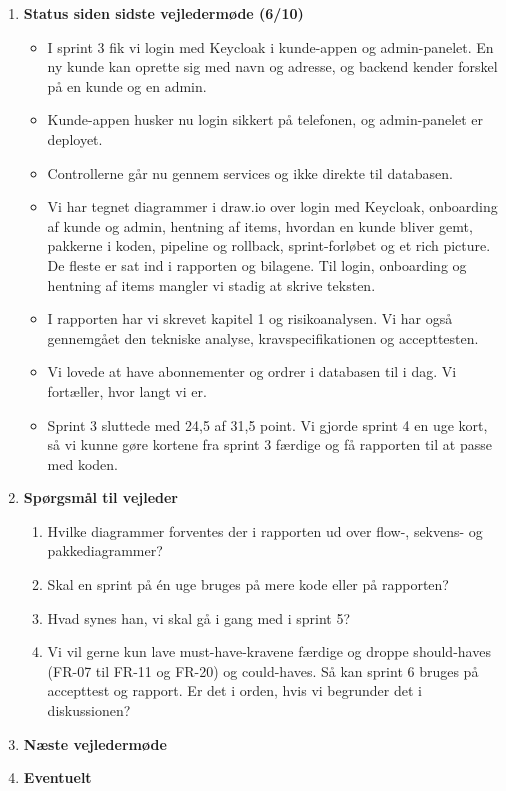 \documentclass[a4paper,11pt]{article}
\begin{document}
\begin{enumerate}
    \item \textbf{Status siden sidste vejledermøde (6/10)}
    \begin{itemize}
        \item I sprint 3 fik vi login med Keycloak i kunde-appen og admin-panelet. En ny kunde kan oprette sig med navn og adresse, og backend kender forskel på en kunde og en admin.
        \item Kunde-appen husker nu login sikkert på telefonen, og admin-panelet er deployet.
        \item Controllerne går nu gennem services og ikke direkte til databasen.
        \item Vi har tegnet diagrammer i draw.io over login med Keycloak, onboarding af kunde og admin, hentning af items, hvordan en kunde bliver gemt, pakkerne i koden, pipeline og rollback, sprint-forløbet og et rich picture. De fleste er sat ind i rapporten og bilagene. Til login, onboarding og hentning af items mangler vi stadig at skrive teksten.
        \item I rapporten har vi skrevet kapitel 1 og risikoanalysen. Vi har også gennemgået den tekniske analyse, kravspecifikationen og accepttesten.
        \item Vi lovede at have abonnementer og ordrer i databasen til i dag. Vi fortæller, hvor langt vi er.
        \item Sprint 3 sluttede med 24,5 af 31,5 point. Vi gjorde sprint 4 en uge kort, så vi kunne gøre kortene fra sprint 3 færdige og få rapporten til at passe med koden.
    \end{itemize}
    \item \textbf{Spørgsmål til vejleder}
    \begin{enumerate}
        \item Hvilke diagrammer forventes der i rapporten ud over flow-, sekvens- og pakkediagrammer?
        \item Skal en sprint på én uge bruges på mere kode eller på rapporten?
        \item Hvad synes han, vi skal gå i gang med i sprint 5?
        \item Vi vil gerne kun lave must-have-kravene færdige og droppe should-haves (FR-07 til FR-11 og FR-20) og could-haves. Så kan sprint 6 bruges på accepttest og rapport. Er det i orden, hvis vi begrunder det i diskussionen?
    \end{enumerate}
    \item \textbf{Næste vejledermøde}
    \item \textbf{Eventuelt}
\end{enumerate}
\end{document}
